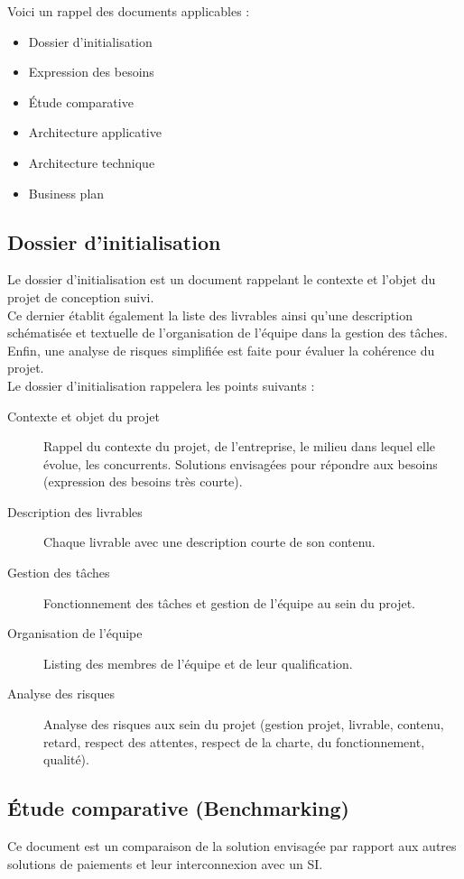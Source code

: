 Voici un rappel des documents applicables :
\begin{itemize}
  \item Dossier d'initialisation
  \item Expression des besoins
  \item Étude comparative
  \item Architecture applicative
  \item Architecture technique
  \item Business plan
\end{itemize}

\subsection{Dossier d'initialisation}
Le dossier d'initialisation est un document rappelant le contexte et l'objet du
projet de conception suivi. \\

Ce dernier établit également la liste des livrables ainsi qu'une description
schématisée et textuelle de l'organisation de l'équipe dans la gestion des
tâches. \\
Enfin, une analyse de risques simplifiée est faite pour évaluer la cohérence du
projet. \\

Le dossier d'initialisation rappelera les points suivants :
\begin{description}
  \item[Contexte et objet du projet] Rappel du contexte du projet, de
    l'entreprise, le milieu dans lequel elle évolue, les concurrents.
    Solutions envisagées pour répondre aux besoins (expression des besoins
    très courte).
  \item[Description des livrables] Chaque livrable avec une description courte
    de son contenu.
  \item[Gestion des tâches] Fonctionnement des tâches et gestion de l'équipe au
    sein du projet.
  \item[Organisation de l'équipe] Listing des membres de l'équipe et de leur
    qualification.
  \item[Analyse des risques] Analyse des risques aux sein du projet (gestion
    projet, livrable, contenu, retard, respect des attentes, respect de
    la charte, du fonctionnement, qualité).
\end{description}

\subsection{Étude comparative (Benchmarking)}
Ce document est un comparaison de la solution envisagée par rapport aux autres
solutions de paiements et leur interconnexion avec un SI. \\

